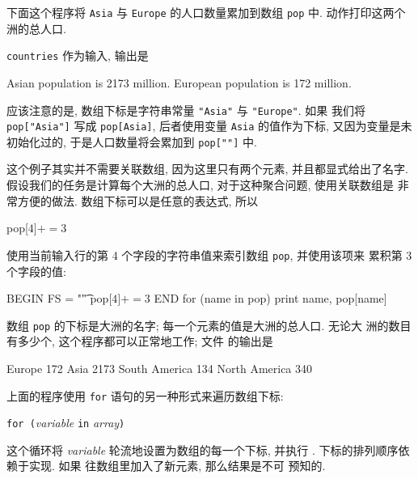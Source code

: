 下面这个程序将 \verb'Asia' 与 \verb'Europe' 的人口数量累加到数组 \verb'pop'
中. \END 动作打印这两个洲的总人口.
\verb'countries' 作为输入, 输出是
\begin{myverb}
    Asian population is 2173 million.
    European population is 172 million.
\end{myverb}
应该注意的是, 数组下标是字符串常量 \verb'"Asia"' 与 \verb'"Europe"'. 如果
我们将 \verb'pop["Asia"]' 写成 \verb'pop[Asia]', 后者使用变量 \verb'Asia'
的值作为下标, 又因为变量是未初始化过的, 于是人口数量将会累加到
\verb'pop[""]' 中.

这个例子其实并不需要关联数组, 因为这里只有两个元素, 并且都显式给出了名字.
假设我们的任务是计算每个大洲的总人口, 对于这种聚合问题, 使用关联数组是
非常方便的做法. 数组下标可以是任意的表达式, 所以
\begin{myverb}
    pop[$4] += $3
\end{myverb}
使用当前输入行的第 4 个字段的字符串值来索引数组 \verb'pop', 并使用该项来
累积第 3 个字段的值:
\begin{myverb}
    BEGIN   { FS = "\t" }
            { pop[$4] += $3 }
    END     { for (name in pop)
                print name, pop[name]
            }
\end{myverb}
数组 \verb'pop' 的下标是大洲的名字; 每一个元素的值是大洲的总人口. 无论大
洲的数目有多少个, 这个程序都可以正常地工作; 文件 
的输出是
\begin{myverb}
    Europe 172
    Asia 2173
    South America 134
    North America 340
\end{myverb}
上面的程序使用 \verb'for' 语句的另一种形式来遍历数组下标:
\begin{pattern}
    \verb'for ('\textit{variable} \verb'in' \textit{array}\verb')' \par
        \indent\indent\stmt
\end{pattern}
这个循环将 \textit{variable} 轮流地设置为数组的每一个下标, 并执行 \stmt.
下标的排列顺序依赖于实现. 如果 \stmt 往数组里加入了新元素, 那么结果是不可
预知的.

